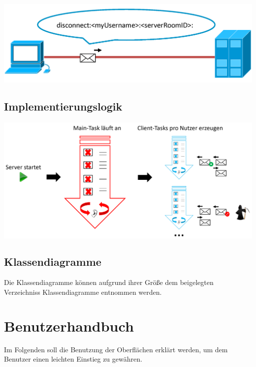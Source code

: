 \documentclass[12pt,a4paper,bibliography=totocnumbered,listof=totocnumbered]{scrartcl}
\begin{document}
\vspace{1em}
\begin{minipage}{\linewidth}
	\centering
	\includegraphics[width=0.7\linewidth]{img/disconnect.png}
	\label{fig:disconnect}
\end{minipage}


\subsection{Implementierungslogik}
\vspace{1em}
\begin{minipage}{\linewidth}
	\centering
	\includegraphics[width=1\linewidth]{img/Implementierungslogik.png}
	\label{fig:Implementierungslogik}
\end{minipage}
\vspace{0.5em}

\subsection{Klassendiagramme}
Die Klassendiagramme können aufgrund ihrer Größe dem beigelegten Verzeichniss 
\glqq Klassendiagramme\grqq{} entnommen werden.

\newpage
\section{Benutzerhandbuch}
Im Folgenden soll die Benutzung der Oberflächen erklärt werden, um dem Benutzer einen leichten Einstieg zu gewähren.
\end{document}
